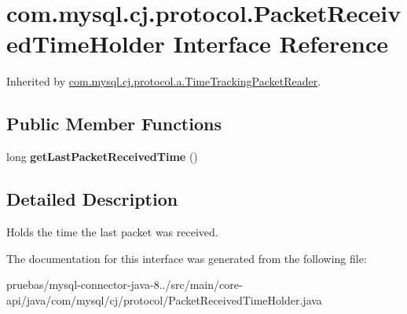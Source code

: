 \hypertarget{interfacecom_1_1mysql_1_1cj_1_1protocol_1_1_packet_received_time_holder}{}\section{com.\+mysql.\+cj.\+protocol.\+Packet\+Received\+Time\+Holder Interface Reference}
\label{interfacecom_1_1mysql_1_1cj_1_1protocol_1_1_packet_received_time_holder}


Inherited by \mbox{\hyperlink{classcom_1_1mysql_1_1cj_1_1protocol_1_1a_1_1_time_tracking_packet_reader}{com.\+mysql.\+cj.\+protocol.\+a.\+Time\+Tracking\+Packet\+Reader}}.

\subsection*{Public Member Functions}
\begin{DoxyCompactItemize}
\item 
\mbox{\label{interfacecom_1_1mysql_1_1cj_1_1protocol_1_1_packet_received_time_holder_ae2740ec8278f582c35b94df0028953be}} 
long {\bfseries get\+Last\+Packet\+Received\+Time} ()
\end{DoxyCompactItemize}


\subsection{Detailed Description}
Holds the time the last packet was received. 

The documentation for this interface was generated from the following file\+:\begin{DoxyCompactItemize}
\item 
pruebas/mysql-\/connector-\/java-\/8../src/main/core-\/api/java/com/mysql/cj/protocol/Packet\+Received\+Time\+Holder.\+java\end{DoxyCompactItemize}
